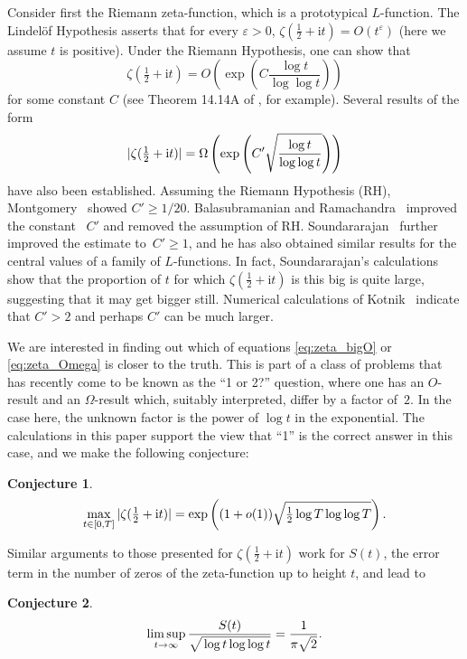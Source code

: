 \documentclass[10pt,reqno,twoside]{amsart}
\renewcommand{\i}{{\mathrm{i}}} %
\newtheorem{conj}{Conjecture}
\numberwithin{equation}{section}
\numberwithin{theorem}{section}
\begin{document}
Consider first the Riemann zeta-function, which is a prototypical
$L$-function. The Lindel\"of Hypothesis  asserts that for every
$\varepsilon>0$, $\zeta(\tfrac12+\i t) = O(t^\varepsilon)$ (here
we assume  $t$ is positive). Under the Riemann Hypothesis, one can
show that
\begin{equation}\label{eq:zeta_bigO}
\zeta(\tfrac12+\i t) = O\left(\exp\left(C\frac{\log t}{\log \log t}\right)\right)
\end{equation}
for some constant $C$ (see Theorem 14.14A of \cite{Ti}, for
example).
Several results of the form
\begin{equation}\label{eq:zeta_Omega}
|\zeta(\tfrac12+\i t)|= \Omega\left(\exp\left(C'\sqrt{\mathstrut \frac{\log t}{\log \log
t}}\right)\right)
\end{equation}
have also been established.
Assuming the Riemann Hypothesis (RH), Montgomery~\cite{Mon} showed $C'\ge 1/20$.
Balasubramanian and
Ramachandra~\cite{BalRam} improved the constant ~$C'$ and removed the
assumption of RH.
Soundararajan~\cite{S} further improved the estimate to~$C'\ge 1$,
and he has also obtained similar results for the central values
of a family of $L$-functions.
In fact,
Soundararajan's calculations show that the proportion of $t$ for
which $\zeta(\tfrac12+\i t)$ is this big is quite large,
suggesting that it may get bigger still.
Numerical calculations of Kotnik~\cite{K} indicate that $C'>2$
and perhaps $C'$ can be much larger.

We are interested in finding out which of equations
\eqref{eq:zeta_bigO} or \eqref{eq:zeta_Omega} is closer to the
truth. This is part of a class of problems that has recently come to be
known as the ``1 or 2?'' question, where one has an $O$-result and an $\Omega$-result
which, suitably interpreted, differ by a factor of~$2$.  In the
case here, the unknown factor is the power of $\log t$ in the
exponential. The calculations in this paper support the view that
``1'' is the correct answer in this case, and we make the
following conjecture:
\begin{conj}\label{conj:max value zeta}
\begin{equation}
\max_{t \in [0,T]} |\zeta(\tfrac12+\i t)| =
\exp\left((1+o(1))\sqrt{\mathstrut \tfrac12 \log T \log\log T}
\right) .
\end{equation}
\end{conj}

Similar arguments to those presented for $\zeta(\frac12+\i t)$
work for $S(t)$, the error term in the number of zeros of the
zeta-function up to height $t$, and lead to
\begin{conj} \label{conj:max value S}
\begin{equation}
\limsup_{t\to\infty} \frac{S(t)}{\sqrt{\mathstrut \mathstrut\log t \log\log t}} =
\frac{1}{\pi\sqrt{\mathstrut 2}} .
\end{equation}
\end{conj}
\end{document}

